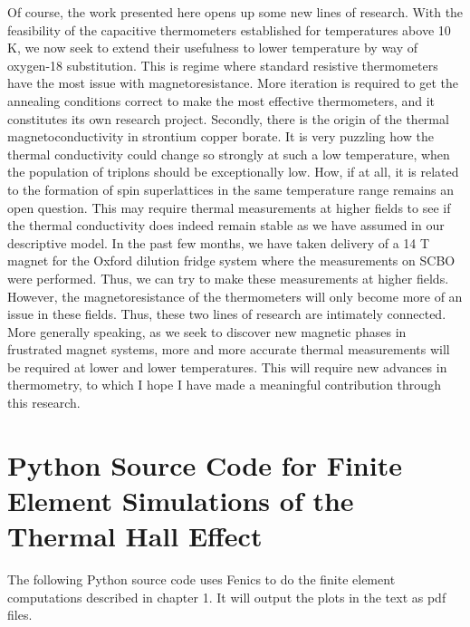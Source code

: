 \documentclass{thesis-umich}
\begin{document}
Of course, the work presented here opens up some new lines of research. With the feasibility of the capacitive thermometers established for temperatures above 10 K, we now seek to extend their usefulness to lower temperature by way of oxygen-18 substitution. This is regime where standard resistive thermometers have the most issue with magnetoresistance. More iteration is required to get the annealing conditions correct to make the most effective thermometers, and it constitutes its own research project. Secondly, there is the origin of the thermal magnetoconductivity in strontium copper borate. It is very puzzling how the thermal conductivity could change so strongly at such a low temperature, when the population of triplons should be exceptionally low. How, if at all, it is related to the formation of spin superlattices in the same temperature range remains an open question. This may require thermal measurements at higher fields to see if the thermal conductivity does indeed remain stable as we have assumed in our descriptive model. In the past few months, we have taken delivery of a 14 T magnet for the Oxford dilution fridge system where the measurements on SCBO were performed. Thus, we can try to make these measurements at higher fields. However, the magnetoresistance of the thermometers will only become more of an issue in these fields. Thus, these two lines of research are intimately connected. More generally speaking, as we seek to discover new magnetic phases in frustrated magnet systems, more and more accurate thermal measurements will be required at lower and lower temperatures. This will require new advances in thermometry, to which I hope I have made a meaningful contribution through this research. 

\appendix
\chapter{Python Source Code for Finite Element Simulations of the Thermal Hall Effect} \label{app:fem_src}

The following Python source code uses Fenics to do the finite element computations described in chapter 1. It will output the plots in the text as pdf files.
\end{document}

